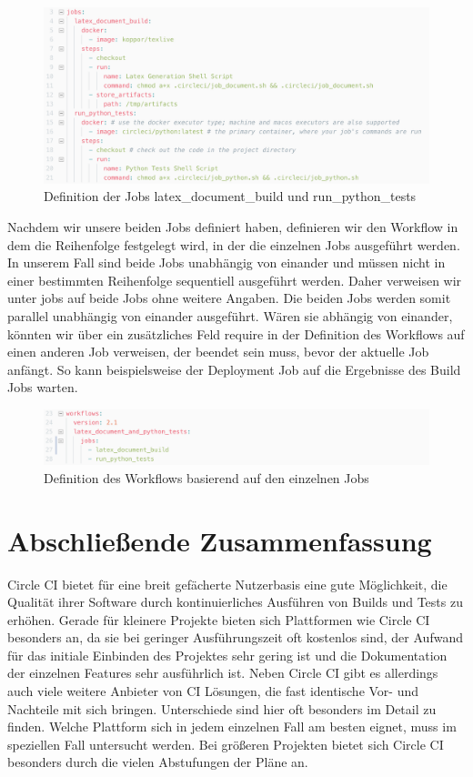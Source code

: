 \documentclass[11pt]{article}
\begin{document}
\begin{figure}[H]
	\centering
  	\includegraphics[width=1\linewidth]{../Images/Config/Jobs}
  	\caption{Definition der Jobs latex\_document\_build und run\_python\_tests}
  	\label{fig:jobs}
\end{figure}

Nachdem wir unsere beiden Jobs definiert haben, definieren wir den Workflow in dem die Reihenfolge festgelegt wird, in der die einzelnen Jobs ausgeführt werden. In unserem Fall sind beide Jobs unabhängig von einander und müssen nicht in einer bestimmten Reihenfolge sequentiell ausgeführt werden. Daher verweisen wir unter jobs auf beide Jobs ohne weitere Angaben. Die beiden Jobs werden somit parallel unabhängig von einander ausgeführt. Wären sie abhängig von einander, könnten wir über ein zusätzliches Feld require in der Definition des Workflows auf einen anderen Job verweisen, der beendet sein muss, bevor der aktuelle Job anfängt. So kann beispielsweise der Deployment Job auf die Ergebnisse des Build Jobs warten.

\begin{figure}[H]
	\centering
  	\includegraphics[width=1\linewidth]{../Images/Config/Workflow}
  	\caption{Definition des Workflows basierend auf den einzelnen Jobs}
  	\label{fig:workflow}
\end{figure}

\section{Abschließende Zusammenfassung}
Circle CI bietet für eine breit gefächerte Nutzerbasis eine gute Möglichkeit, die Qualität ihrer Software durch kontinuierliches Ausführen von Builds und Tests zu erhöhen. Gerade für kleinere Projekte bieten sich Plattformen wie Circle CI besonders an, da sie bei geringer Ausführungszeit oft kostenlos sind, der Aufwand für das initiale Einbinden des Projektes sehr gering ist und die Dokumentation der einzelnen Features sehr ausführlich ist. Neben Circle CI gibt es allerdings auch viele weitere Anbieter von CI Lösungen, die fast identische Vor- und Nachteile mit sich bringen. Unterschiede sind hier oft besonders im Detail zu finden. Welche Plattform sich in jedem einzelnen Fall am besten eignet, muss im speziellen Fall untersucht werden.
Bei größeren Projekten bietet sich Circle CI besonders durch die vielen Abstufungen der Pläne an.
\end{document}
